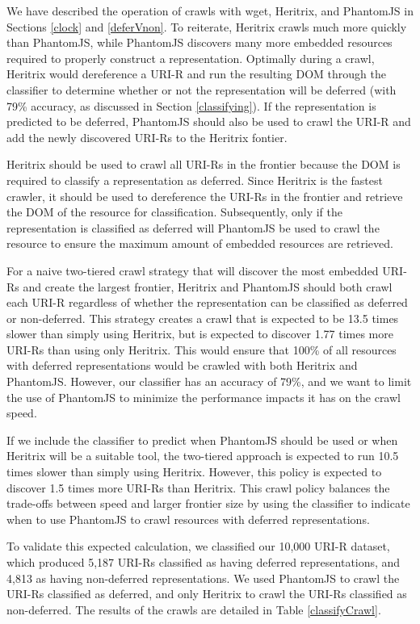 \documentclass{sig-alternate}
\begin{document}
We have described the operation of crawls with wget, Heritrix, and PhantomJS in Sections \ref{clock} and \ref{deferVnon}. To reiterate, Heritrix crawls much more quickly than PhantomJS, while PhantomJS discovers many more embedded resources required to properly construct a representation. Optimally during a crawl, Heritrix would dereference a URI-R and run the resulting DOM through the classifier to determine whether or not the representation will be deferred (with 79\% accuracy, as discussed in Section \ref{classifying}). If the representation is predicted to be deferred, PhantomJS should also be used to crawl the URI-R and add the newly discovered URI-Rs to the Heritrix fontier. 

Heritrix should be used to crawl all URI-Rs in the frontier because the DOM is required to classify a representation as deferred. Since Heritrix is the fastest crawler, it should be used to dereference the URI-Rs in the frontier and retrieve the DOM of the resource for classification. Subsequently, only if the representation is classified as deferred will PhantomJS be used to crawl the resource to ensure the maximum amount of embedded resources are retrieved.

For a naive two-tiered crawl strategy that will discover the most embedded URI-Rs and create the largest frontier, Heritrix and PhantomJS should both crawl each URI-R regardless of whether the representation can be classified as deferred or non-deferred. This strategy creates a crawl that is expected to be 13.5 times slower than simply using Heritrix, but is expected to discover 1.77 times more URI-Rs than using only Heritrix. This would ensure that 100\% of all resources with deferred representations would be crawled with both Heritrix and PhantomJS. However, our classifier has an accuracy of 79\%, and we want to limit the use of PhantomJS to minimize the performance impacts it has on the crawl speed.

If we include the classifier to predict when PhantomJS should be used or when Heritrix will be a suitable tool, the two-tiered approach is expected to run 10.5 times slower than simply using Heritrix. However, this policy is expected to discover 1.5 times more URI-Rs than Heritrix. This crawl policy balances the trade-offs between speed and larger frontier size by using the classifier to indicate when to use PhantomJS to crawl resources with deferred representations.

To validate this expected calculation, we classified our 10,000 URI-R dataset, which produced 5,187 URI-Rs classified as having deferred representations, and 4,813 as having non-deferred representations. We used PhantomJS to crawl the URI-Rs classified as deferred, and only Heritrix to crawl the URI-Rs classified as non-deferred. The results of the crawls are detailed in Table \ref{classifyCrawl}.
\end{document}
